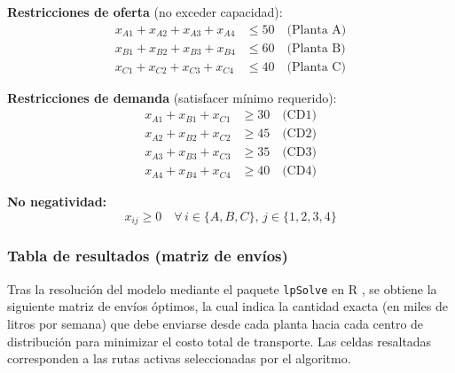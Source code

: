 \documentclass[12pt,a4paper]{article}
\begin{document}
\noindent\textbf{Restricciones de oferta} (no exceder capacidad):
\begin{align}
  x_{A1} + x_{A2} + x_{A3} + x_{A4} &\leq 50 \quad \text{(Planta A)} \\
  x_{B1} + x_{B2} + x_{B3} + x_{B4} &\leq 60 \quad \text{(Planta B)} \\
  x_{C1} + x_{C2} + x_{C3} + x_{C4} &\leq 40 \quad \text{(Planta C)}
\end{align}

\noindent\textbf{Restricciones de demanda} (satisfacer m\'{i}nimo requerido):
\begin{align}
  x_{A1} + x_{B1} + x_{C1} &\geq 30 \quad \text{(CD1)} \\
  x_{A2} + x_{B2} + x_{C2} &\geq 45 \quad \text{(CD2)} \\
  x_{A3} + x_{B3} + x_{C3} &\geq 35 \quad \text{(CD3)} \\
  x_{A4} + x_{B4} + x_{C4} &\geq 40 \quad \text{(CD4)}
\end{align}

\noindent\textbf{No negatividad:}
\begin{equation}
  x_{ij} \geq 0 \quad \forall\, i \in \{A,B,C\}, \, j \in \{1,2,3,4\}
\end{equation}

\subsubsection{Tabla de resultados (matriz de env\'{i}os)}

Tras la resoluci\'{o}n del modelo mediante el paquete \texttt{lpSolve} en R 
\cite{rprogramming2024}, se obtiene la siguiente matriz de env\'{i}os \'{o}ptimos, la 
cual indica la cantidad exacta (en miles de litros por semana) que debe enviarse desde 
cada planta hacia cada centro de distribuci\'{o}n para minimizar el costo total de 
transporte. Las celdas resaltadas corresponden a las rutas activas 
seleccionadas por el algoritmo.
\end{document}
